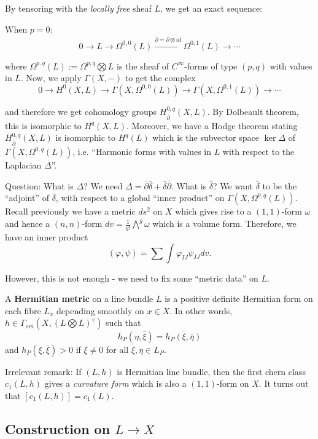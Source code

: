 By tensoring with the \emph{locally free} sheaf $L$, we get an exact sequence:

When $p=0$:
\[
0\to L \to \Omega^{0,0}(L)\overset{\bar{\partial}=\bar{\partial}\otimes id}{\to} \Omega^{0,1}(L)\to \cdots
\]

where $\Omega^{p,q}(L):=\Omega^{p,q}\bigotimes L$ is the sheaf of $C^\infty$-forms of type $(p,q)$ with values in $L$. Now, we apply $\Gamma(X,-)$ to get the complex 
\[
0\to H^0(X,L)\to \Gamma(X,\Omega^{0,0}(L))\to \Gamma(X,\Omega^{0,1}(L))\to \cdots
\]

and therefore we get cohomology groups $H_{\bar{\partial}}^{0,q}(X,L)$. By Dolbeault theorem, this is isomorphic to $H^q(X,L)$. Moreover, we have a Hodge theorem stating $H^{0,q}_{\bar{\partial}}(X,L)$ is isomorphic to $H^q(L)$ which is the subvector space $\ker \Delta$ of $\Gamma(X,\Omega^{0,q}(L))$, i.e. ``Harmonic forms with values in $L$ with respect to the Laplacian $\Delta$''. 

Question: What is $\Delta$? We need $\Delta=\bar{\partial}\bar{\delta}+\bar{\delta}\bar{\partial}$. What is $\bar{\delta}$? We want $\bar{\delta}$ to be the ``adjoint'' of $\bar{\delta}$, with respect to a global ``inner product'' on $\Gamma(X,\Omega^{0,q}(L))$. Recall previously we have a metric $ds^2$ on $X$ which gives rise to a $(1,1)$-form $\omega$ and hence a $(n,n)$-form $dv=\frac{1}{g!}\bigwedge^g \omega$ which is a volume form. Therefore, we have an inner product 
$$(\varphi,\psi)=\sum\int \varphi_{IJ}\psi_{IJ}dv.$$

However, this is not enough - we need to fix some ``metric data'' on $L$. 

\begin{definition}
A \textbf{Hermitian metric} on a line bundle $L$ is a positive definite Hermitian form on each fibre $L_x$ depending smoothly on $x\in X$. In other words, $h\in \Gamma_{sm}(X,(L\bigotimes L)^v)$ such that 
$$h_P(\eta,\bar{\xi})=\overline{h_P(\xi,\bar{\eta})}$$
and 
$h_P(\xi,\bar{\xi})>0$ if $\xi\not= 0$
for all $\xi,\eta\in L_P$.  
\end{definition}


Irrelevant remark: If $(L,h)$ is  Hermitian line bundle, then the first chern class $c_1(L,h)$ gives a \emph{curvature form} which is also a $(1,1)$-form on $X$. It turns out that $[c_1(L,h)]=c_1(L)$. 

\subsection{Construction on $L\to X$}

